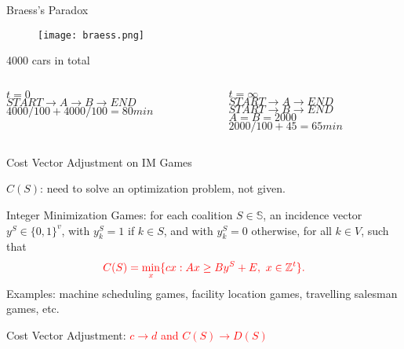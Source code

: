\documentclass[14pt]{beamer}
\newcommand{\Z}{\mathbb{Z}}
\begin{document}
\begin{frame}{Braess's Paradox}
\vspace{-5mm}
\begin{figure}[H]
\centering
\texttt{[image: braess.png]}
\end{figure}
\centering
\vspace{-6mm}
4000 cars in total
\vspace{4mm}
\begin{columns}
\begin{column}{5.5cm}
\small
\centering
\pause
$t = 0$\\
\vspace{2mm}
$START \rightarrow A \rightarrow B \rightarrow END$\\
\vspace{2mm}
$4000/100  + 4000/100 = 80 min$
\end{column}
\begin{column}{5.5cm}
\small
\centering
\pause
$t = \infty$\\
\vspace{2mm}
$START \rightarrow A  \rightarrow END$\\
\vspace{2mm}
$START  \rightarrow B \rightarrow END$\\
\vspace{2mm}
$A=B=2000$\\
\vspace{2mm}
$2000/100+45=65min$
\end{column}
\vspace{-5mm}
\end{columns}
\vspace{-5mm}
\end{frame}



\begin{frame}{Cost Vector Adjustment on IM Games}
\justifying
\vspace{-2mm}
\begin{shaded}
$C(S)$: need to solve an optimization problem, not given.
\end{shaded}

Integer Minimization Games:
for each coalition $S \in \mathbb{S}$, an incidence vector $y^S \in \{0,1\}^{v}$, with $y_k^S=1$ if $k \in S$, and with $y_k^S=0$ otherwise, for all $k \in V$, such that
\begin{equation*}
\color{red}
C(S) = \min_{x} \{ cx: Ax \geq By^S + E, ~x \in \Z^{t} \}.
\end{equation*}
Examples: machine scheduling games, facility location games, travelling salesman games, etc.
\center
\pause
\begin{shaded}
Cost Vector Adjustment: \textcolor{red}{$ c \rightarrow d$ and $C(S) \rightarrow D(S)$}
\end{shaded}
\end{frame}
\end{document}
